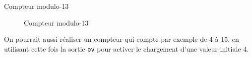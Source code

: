 \documentclass[presentation]{beamer}
\begin{document}
\begin{frame}[label={sec:org600c776},fragile]{Compteur modulo-13}
 \begin{figure}[htbp]
\centering

\caption{\label{fig:org9810a3f}Compteur modulo-13}
\end{figure}

On pourrait aussi réaliser un compteur qui compte par exemple de 4 à
15, en utilisant cette fois la sortie \texttt{ov} pour activer le chargement
d'une valeur initiale 4.
\end{frame}
\end{document}
